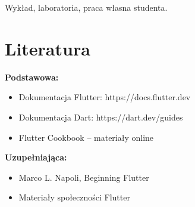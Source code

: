 \documentclass[12pt, a4paper]{article}
\begin{document}
Wykład, laboratoria, praca własna studenta.

\section{Literatura}

\textbf{Podstawowa:}
\begin{itemize}
  \item Dokumentacja Flutter: https://docs.flutter.dev
  \item Dokumentacja Dart: https://dart.dev/guides
  \item Flutter Cookbook – materiały online
\end{itemize}

\textbf{Uzupełniająca:}
\begin{itemize}
  \item Marco L. Napoli, Beginning Flutter
  \item Materiały społeczności Flutter
\end{itemize}
\end{document}
